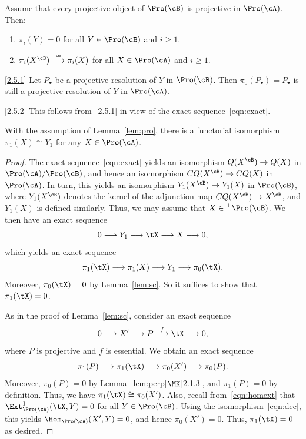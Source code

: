 \begin{lemm}\label{lem:pro}
Assume that every projective object of $\Pro(\cB)$ is projective in $\Pro(\cA)$. Then:
\begin{enumerate}\romanenumi
\item \label{2.5.1} $\pi_i(Y) = 0$ for all $Y \in \Pro(\cB)$ and $i \geq 1$.
\item \label{2.5.2} $\pi_i(X^{\cB}) \stackrel{\cong}{\longrightarrow} \pi_i(X)$ for all $X \in \Pro(\cA)$ and $i \geq 1$.
\end{enumerate}
\end{lemm}

\begin{proofc}
\begin{step}{\eqref{2.5.1}}%
Let $P_{\bullet}$ be a projective resolution of $Y$ in $\Pro(\cB)$. Then $\pi_0(P_{\bullet}) = P_{\bullet}$ is still a projective resolution of $Y$ in $\Pro(\cA)$.
\end{step}

\begin{laststep}{\eqref{2.5.2}}%
This follows from~\eqref{2.5.1} in view of the exact sequence~\eqref{eqn:exact}.
\end{laststep}
\let\qed\relax
\end{proofc}

\begin{lemm}\label{lem:fund}
With the assumption of Lemma~\ref{lem:pro}, there is a functorial isomorphism $\pi_1(X) \cong Y_1$ for any $X \in \Pro(\cA)$.
\end{lemm}

\begin{proof}
The exact sequence~\eqref{eqn:exact} yields an isomorphism $Q(X^{\cB}) \to Q(X)$ in $\Pro(\cA)/\Pro(\cB)$, and hence an isomorphism $CQ(X^{\cB}) \to CQ(X)$ in $\Pro(\cA)$. In turn, this yields an isomorphism $Y_1(X^{\cB}) \to Y_1(X)$ in $\Pro(\cB)$, where $Y_1(X^{\cB})$ denotes the kernel of the adjunction map $CQ(X^{\cB}) \to X^{\cB}$, and $Y_1(X)$ is defined similarly. Thus, we may assume that $X \in {^{\perp}\Pro(\cB)}$. We then have an exact sequence
\[
0 \longrightarrow Y_1 \longrightarrow \tX \longrightarrow X \longrightarrow 0,
\]
which yields an exact sequence
\[
\pi_1(\tX) \longrightarrow \pi_1(X) \longrightarrow Y_1 \longrightarrow \pi_0(\tX).
\]
Moreover, $\pi_0(\tX) = 0$ by Lemma~\ref{lem:sc}. So it suffices to show that $\pi_1(\tX) = 0$.

As in the proof of Lemma~\ref{lem:sc}, consider an exact sequence
\[
0 \longrightarrow X' \longrightarrow P
\stackrel{f}{\longrightarrow} \tX \longrightarrow 0,
\]
where $P$ is projective and $f$ is essential. We obtain an exact sequence
\[
\pi_1(P) \longrightarrow \pi_1(\tX) \longrightarrow
\pi_0(X') \longrightarrow \pi_0(P).
\]
Moreover, $\pi_0(P) = 0$ by Lemma~\ref{lem:perp}$\MK$\eqref{2.1.3}, and $\pi_1(P) = 0$ by definition. Thus, we have $\pi_1(\tX) \cong \pi_0(X')$. Also, recall from~\eqref{eqn:homext} that $\Ext^1_{\Pro(\cA)}(\tX,Y) = 0$ for all $Y \in \Pro(\cB)$. Using the isomorphism~\eqref{eqn:dec}, this yields $\Hom_{\Pro(\cA)}(X',Y) = 0$, and hence $\pi_0(X') = 0$. Thus, $\pi_1(\tX) = 0$ as desired.
\end{proof}

